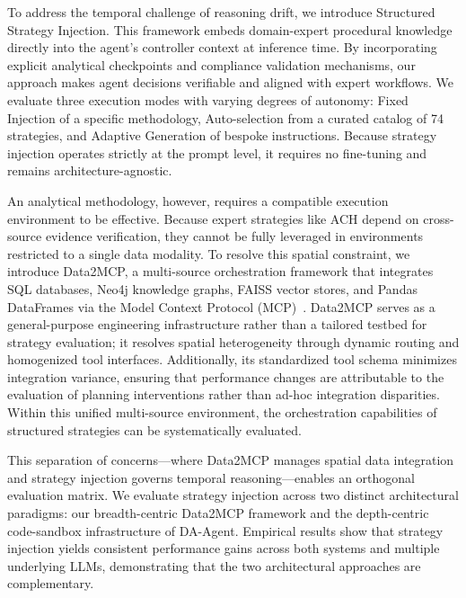 To address the temporal challenge of reasoning drift, we introduce Structured Strategy Injection. This framework embeds domain-expert procedural knowledge directly into the agent's controller context at inference time. 
By incorporating explicit analytical checkpoints and compliance validation mechanisms, our approach makes agent decisions verifiable and aligned with expert workflows. We evaluate three execution modes with varying degrees of autonomy: Fixed Injection of a specific methodology, Auto-selection from a curated catalog of 74 strategies, and Adaptive Generation of bespoke instructions. Because strategy injection operates strictly at the prompt level, it requires no fine-tuning and remains architecture-agnostic.

An analytical methodology, however, requires a compatible execution environment to be effective. Because expert strategies like ACH depend on cross-source evidence verification, they cannot be fully leveraged in environments restricted to a single data modality. 
To resolve this spatial constraint, we introduce Data2MCP, a multi-source orchestration framework that integrates SQL databases, Neo4j knowledge graphs, FAISS vector stores, and Pandas DataFrames via the Model Context Protocol (MCP)~\cite{mcp2024}. 
Data2MCP serves as a general-purpose engineering infrastructure rather than a tailored testbed for strategy evaluation; it resolves spatial heterogeneity through dynamic routing and homogenized tool interfaces. 
Additionally, its standardized tool schema minimizes integration variance, ensuring that performance changes are attributable to the evaluation of planning interventions rather than ad-hoc integration disparities. Within this unified multi-source environment, the orchestration capabilities of structured strategies can be systematically evaluated.

This separation of concerns—where Data2MCP manages spatial data integration and strategy injection governs temporal reasoning—enables an orthogonal evaluation matrix. 
We evaluate strategy injection across two distinct architectural paradigms: our breadth-centric Data2MCP framework and the depth-centric code-sandbox infrastructure of DA-Agent. 
Empirical results show that strategy injection yields consistent performance gains across both systems and multiple underlying LLMs, demonstrating that the two architectural approaches are complementary.

